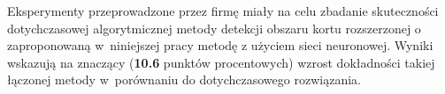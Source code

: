 Eksperymenty przeprowadzone przez firmę \blue{} miały na celu zbadanie skuteczności dotychczasowej algorytmicznej metody detekcji obszaru kortu rozszerzonej o zaproponowaną w~niniejszej pracy metodę z użyciem sieci neuronowej. Wyniki wskazują na znaczący (\textbf{10.6} punktów procentowych) wzrost dokładności takiej łączonej metody w~porównaniu do dotychczasowego rozwiązania.
